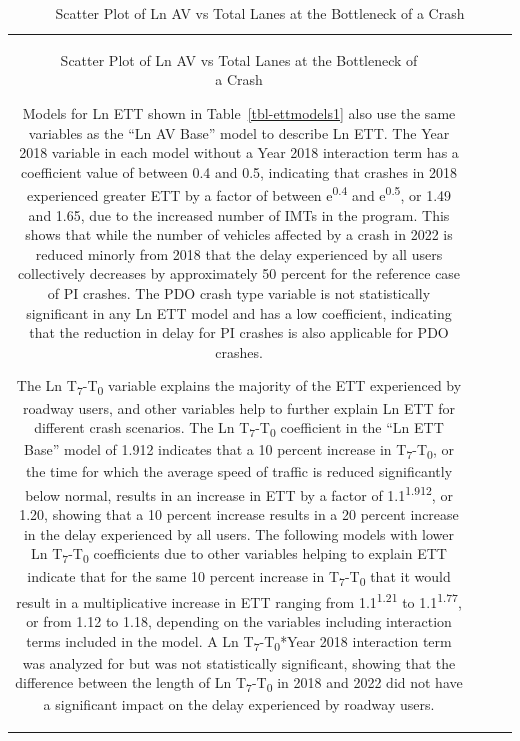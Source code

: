 \documentclass[
  letterpaper,
  authoryear]{elsarticle}
\begin{document}
\begin{table}
{\begin{tabular}[t]{c|c|c|c}
\begin{table}
\begin{figure}
{}

\caption{\label{fig-LnAVvsTotalLanes}Scatter Plot of Ln AV vs Total
Lanes at the Bottleneck of a Crash}

\end{figure}%

Models for Ln ETT shown in Table~\ref{tbl-ettmodels1} also use the same
variables as the ``Ln AV Base'' model to describe Ln ETT. The Year 2018
variable in each model without a Year 2018 interaction term has a
coefficient value of between 0.4 and 0.5, indicating that crashes in
2018 experienced greater ETT by a factor of between
e\textsuperscript{0.4} and e\textsuperscript{0.5}, or 1.49 and 1.65, due
to the increased number of IMTs in the program. This shows that while
the number of vehicles affected by a crash in 2022 is reduced minorly
from 2018 that the delay experienced by all users collectively decreases
by approximately 50 percent for the reference case of PI crashes. The
PDO crash type variable is not statistically significant in any Ln ETT
model and has a low coefficient, indicating that the reduction in delay
for PI crashes is also applicable for PDO crashes.

The Ln T\textsubscript{7}-T\textsubscript{0} variable explains the
majority of the ETT experienced by roadway users, and other variables
help to further explain Ln ETT for different crash scenarios. The Ln
T\textsubscript{7}-T\textsubscript{0} coefficient in the ``Ln ETT Base''
model of 1.912 indicates that a 10 percent increase in
T\textsubscript{7}-T\textsubscript{0}, or the time for which the average
speed of traffic is reduced significantly below normal, results in an
increase in ETT by a factor of 1.1\textsuperscript{1.912}, or 1.20,
showing that a 10 percent increase results in a 20 percent increase in
the delay experienced by all users. The following models with lower Ln
T\textsubscript{7}-T\textsubscript{0} coefficients due to other
variables helping to explain ETT indicate that for the same 10 percent
increase in T\textsubscript{7}-T\textsubscript{0} that it would result
in a multiplicative increase in ETT ranging from
1.1\textsuperscript{1.21} to 1.1\textsuperscript{1.77}, or from 1.12 to
1.18, depending on the variables including interaction terms included in
the model. A Ln T\textsubscript{7}-T\textsubscript{0}*Year 2018
interaction term was analyzed for but was not statistically significant,
showing that the difference between the length of Ln
T\textsubscript{7}-T\textsubscript{0} in 2018 and 2022 did not have a
significant impact on the delay experienced by roadway users.


\end{table}
\end{tabular}}
\end{table}
\end{document}
